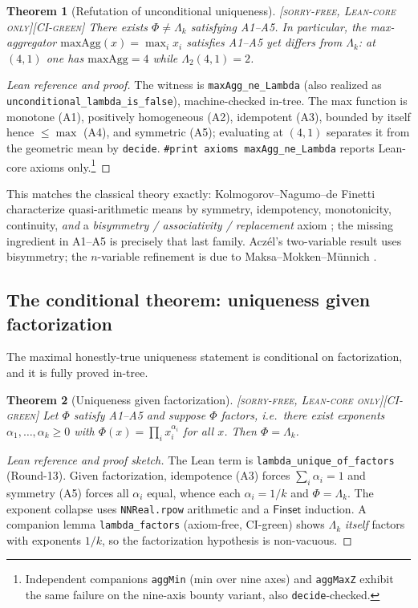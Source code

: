 \documentclass[11pt]{article}
\theoremstyle{plain}
\newtheorem{theorem}{Theorem}[section]
\theoremstyle{definition}
\theoremstyle{remark}
\newcommand{\statusSorryFree}{\textcolor{szlteal}{\textsc{[sorry-free, Lean-core only]}}}
\newcommand{\statusCI}{\textcolor{szlteal}{\textsc{[CI-green]}}}
\newcommand{\La}{\Lambda}
\newcommand{\printax}[1]{\texttt{\#print axioms}~\texttt{#1}}
\begin{document}
\begin{theorem}[Refutation of unconditional uniqueness]
\label{thm:false}
\statusSorryFree\;\statusCI\;
There exists $\Phi \neq \La_k$ satisfying A1--A5. In particular, the max-aggregator
$\mathrm{maxAgg}(x) = \max_i x_i$ satisfies A1--A5 yet differs from $\La_k$:
at $(4,1)$ one has $\mathrm{maxAgg}=4$ while $\La_2(4,1)=2$.
\end{theorem}
\begin{proof}[Lean reference and proof]
The witness is \texttt{maxAgg\_ne\_Lambda} (also realized as
\texttt{unconditional\_lambda\_is\_false}), machine-checked in-tree. The max
function is monotone (A1), positively homogeneous (A2), idempotent (A3), bounded by
itself hence $\le\max$ (A4), and symmetric (A5); evaluating at $(4,1)$ separates it
from the geometric mean by \texttt{decide}. \printax{maxAgg\_ne\_Lambda} reports
Lean-core axioms only.\footnote{Independent companions \texttt{aggMin} (min over
nine axes) and \texttt{aggMaxZ} exhibit the same failure on the
nine-axis bounty variant, also \texttt{decide}-checked.}
\end{proof}

This matches the classical theory exactly: Kolmogorov--Nagumo--de Finetti
characterize quasi-arithmetic means by symmetry, idempotency, monotonicity,
continuity, \emph{and} a \emph{bisymmetry / associativity / replacement} axiom
\cite{quasiarith,aczel1948}; the missing ingredient in A1--A5 is precisely that
last family. Acz\'el's two-variable result uses bisymmetry; the $n$-variable
refinement is due to Maksa--Mokken--M\"unnich \cite{naryqam2026}.

\subsection{The conditional theorem: uniqueness given factorization}
The maximal honestly-true uniqueness statement is conditional on factorization, and
it is fully proved in-tree.

\begin{theorem}[Uniqueness given factorization]
\label{thm:factors}
\statusSorryFree\;\statusCI\;
Let $\Phi$ satisfy A1--A5 and suppose $\Phi$ \emph{factors}, i.e.\ there exist
exponents $\alpha_1,\dots,\alpha_k \ge 0$ with $\Phi(x) = \prod_i x_i^{\alpha_i}$
for all $x$. Then $\Phi = \La_k$.
\end{theorem}
\begin{proof}[Lean reference and proof sketch]
The Lean term is \texttt{lambda\_unique\_of\_factors} (Round-13). Given
factorization, idempotence (A3) forces $\sum_i \alpha_i = 1$ and symmetry (A5)
forces all $\alpha_i$ equal, whence each $\alpha_i = 1/k$ and $\Phi = \La_k$. The
exponent collapse uses \texttt{NNReal.rpow} arithmetic and a $\mathsf{Finset}$
induction. A companion lemma \texttt{lambda\_factors} (axiom-free, CI-green) shows
$\La_k$ \emph{itself} factors with exponents $1/k$, so the factorization hypothesis
is non-vacuous.
\end{proof}
\end{document}
